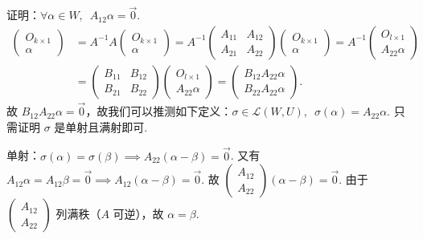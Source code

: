 \documentclass[12pt,fontset=fandol]{ctexart}
\begin{document}
\begin{solve}
证明：$ \forall \alpha \in W,\enspace A_{12} \alpha = \vec{0} $.
            \begin{align*}
                \begin{pmatrix} O_{k \times 1} \\ \alpha \end{pmatrix}
                & = A^{-1}A \begin{pmatrix} O_{k \times 1} \\ \alpha \end{pmatrix} = A^{-1} \begin{pmatrix} A_{11} & A_{12} \\ A_{21} & A_{22} \end{pmatrix} \begin{pmatrix} O_{k \times 1} \\ \alpha \end{pmatrix} = A^{-1} \begin{pmatrix} O_{l \times 1} \\ A_{22} \alpha \end{pmatrix} \\
                & = \begin{pmatrix} B_{11} & B_{12} \\ B_{21} & B_{22} \end{pmatrix} \begin{pmatrix} O_{l \times 1} \\ A_{22} \alpha \end{pmatrix} = \begin{pmatrix} B_{12} A_{22} \alpha \\ B_{22} A_{22} \alpha \end{pmatrix}.
            \end{align*}
            故 $ B_{12} A_{22} \alpha = \vec{0} $，故我们可以推测如下定义：$ \sigma \in \mathcal{L}(W,U),\enspace \sigma(\alpha) = A_{22} \alpha $.
            只需证明 $ \sigma $ 是单射且满射即可.

            单射：$ \sigma(\alpha) = \sigma(\beta) \implies A_{22}(\alpha - \beta) = \vec{0} $. 又有 $ A_{12} \alpha = A_{12} \beta = \vec{0} \implies A_{12}( \alpha - \beta) = \vec{0} $. 故 $ \begin{pmatrix} A_{12} \\ A_{22} \end{pmatrix} (\alpha - \beta) = \vec{0} $. 由于 $ \begin{pmatrix} A_{12} \\ A_{22} \end{pmatrix} $ 列满秩（$ A $ 可逆），故 $ \alpha = \beta $.


\end{solve}
\end{document}
